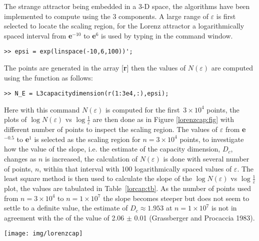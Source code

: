 \newpage



The strange attractor being embedded in a 3{-}D space, the algorithms have been implemented to compute using the 3 components. A large range of $\varepsilon$ is first selected to locate the scaling region, for the Lorenz attractor a logarithmically spaced interval from \textbf{e$^{-10}$} to \textbf{e$^{6}$} is used by typing in the command window. 
\begin{verbatim}
>> epsi = exp(linspace(-10,6,100))';
\end{verbatim}
The points are generated in the array [\textbf{r}] then the values of $N(\varepsilon)$ are computed using the function as follows:
\begin{verbatim}
>> N_E = L3capacitydimension(r(1:3e4,:),epsi);
\end{verbatim}
Here with this command $N(\varepsilon)$ is computed for the first~$3\times10^{4}$ points, the plots of $\log{N(\varepsilon)}$ vs $\log{\frac{1}{\varepsilon}}$ are then done as in Figure \ref{lorenzcap:fig} with different number of points to inspect the scaling region. The values of $\varepsilon$ from \textbf{e$^{-0.5}$} to \textbf{e$^{1}$} is selected as the scaling region for $n = 3\times10^{4}$ points, to investigate how the value of the slope, i.e. the estimate of the capacity dimension, $D_{c}$, changes as $n$ is increased, the calculation of $N(\varepsilon)$ is done with several number of points, $n$, within that interval with 100 logarithmically spaced values of $\varepsilon$. The least square method is then used to calculate the slope of the $\log{N(\varepsilon)}$ vs $\log{\frac{1}{\varepsilon}}$ plot, the values are tabulated in Table~\ref{lorcap:tb}. As the number of points used from $n = 3 \times 10^{4}$ to $n = 1 \times 10^{7}$ the slope becomes steeper but does not seem to settle to a definite value, the estimate of $D_{c} \approx 1.953$ at $n = 1 \times 10^{7}$ is not in agreement with the of the value of 2.06 $\pm$ 0.01 (Grassberger and Procaccia 1983).
\begin{center}
\texttt{[image: img/lorenzcap]}
\label{lorenzcap:fig}
\end{center}

